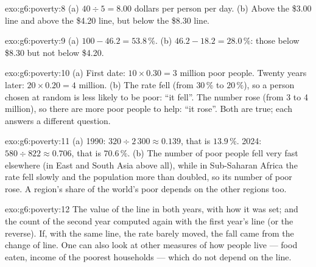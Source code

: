 \begin{solution}{exo:g6:poverty:8}
(a) $40 \div 5 = 8.00$ dollars per person per day. (b) Above the \$3.00 line and
above the \$4.20 line, but below the \$8.30 line.
\end{solution}

\begin{solution}{exo:g6:poverty:9}
(a) $100 - 46.2 = 53.8\,\%$. (b) $46.2 - 18.2 = 28.0\,\%$: those below \$8.30 but
not below \$4.20.
\end{solution}

\begin{solution}{exo:g6:poverty:10}
(a) First date: $10 \times 0.30 = 3$ million poor people. Twenty years later:
$20 \times 0.20 = 4$ million. (b) The rate fell (from $30\,\%$ to $20\,\%$), so a
person chosen at random is less likely to be poor: ``it fell''. The number rose
(from 3 to 4 million), so there are more poor people to help: ``it rose''. Both
are true; each answers a different question.
\end{solution}

\begin{solution}{exo:g6:poverty:11}
(a) 1990: $320 \div 2\,300 \approx 0.139$, that is $13.9\,\%$. 2024: $580 \div 822
\approx 0.706$, that is $70.6\,\%$. (b) The number of poor people fell very fast
elsewhere (in East and South Asia above all), while in Sub-Saharan Africa the rate
fell slowly and the population more than doubled, so its number of poor rose. A
region's share of the world's poor depends on the other regions too.
\end{solution}

\begin{solution}{exo:g6:poverty:12}
The value of the line in both years, with how it was set; and the count of the
second year computed again with the first year's line (or the reverse). If, with
the same line, the rate barely moved, the fall came from the change of line. One
can also look at other measures of how people live --- food eaten, income of the
poorest households --- which do not depend on the line.
\end{solution}

